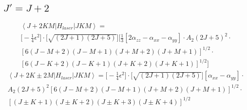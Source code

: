 \documentclass{article}
\newcommand{\ket}[1]{\left |{#1}\right \rangle}
\newcommand{\bra}[1]{\left \langle {#1}\right |}
\newcommand{\wigner}[6]{\begin{pmatrix}{#1}&{#2}&{#3}\\{#4}&{#5}&{#6}\end{pmatrix}}
\begin{document}
\subsection{$J'=J+2$}
\begin{align*}
  \bra{J+2KM}H_{laser}\ket{JKM}=\\
\bigg[-\frac{1}{4}\epsilon^2\bigg]\cdot \bigg[ \sqrt{(2J+1)(2J+5)}\bigg] \bigg[\frac{1}{3}[2\alpha_{zz}-\alpha_{xx}-\alpha_{yy}] 
\cdot A_2(2J+5)^2\cdot \\ 
[6(J-M+2)(J-M+1)(J+M+2)(J+M+1)]^{1/2} \cdot \\ 
[6(J-K+2)(J-K+1)(J+K+2)(J+K+1)]^{1/2}\bigg]
\end{align*}
\begin{align*}
  \bra{J+2K\pm2M}H_{laser}\ket{JKM}= \bigg[ - \frac{1}{4}\epsilon^2 \bigg] \cdot \bigg[ \sqrt{(2J+1)(2J+5)}\bigg] [\alpha_{xx}-\alpha_{yy}] \cdot \\ A_2(2J+5)^2[6(J-M+2)(J-M+1)(J+M+2)(J+M+1)]^{1/2}\cdot \\ [(J\pm K+1)(J \pm K+2)(J \pm K+3)(J \pm K+4)]^{1/2}
\end{align*}
\end{document}
